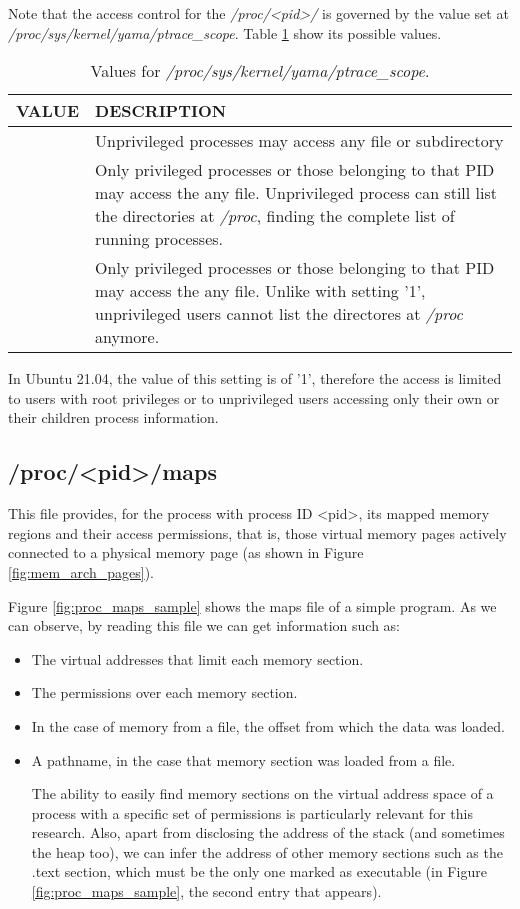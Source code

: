 Note that the access control for the \textit{/proc/<pid>/} is governed by the value set at \textit{/proc/sys/kernel/yama/ptrace\_scope}. Table \ref{table:yama_values} show its possible values.

\begin{table}[htbp]
\begin{tabular}{|>{\centering\arraybackslash}p{3cm}|>{\centering\arraybackslash}p{11cm}|}
\hline
\textbf{VALUE} & \textbf{DESCRIPTION}\\
\hline
\hline
0 & Unprivileged processes may access any file or subdirectory\\
\hline
1 & Only privileged processes or those belonging to that PID may access the any file. Unprivileged process can still list the directories at \textit{/proc}, finding the complete list of running processes.\\
\hline
2 & Only privileged processes or those belonging to that PID may access the any file. Unlike with setting '1', unprivileged users cannot list the directores at \textit{/proc} anymore.\\ 
\hline
\end{tabular}
\caption{Values for \textit{/proc/sys/kernel/yama/ptrace\_scope}.}
\label{table:yama_values}
\end{table}

In Ubuntu 21.04, the value of this setting is of '1', therefore the access is limited to users with root privileges or to unprivileged users accessing only their own or their children process information.

\subsection{/proc/<pid>/maps} \label{subsection:proc_maps}
This file provides, for the process with process ID <pid>, its mapped memory regions and their access permissions, that is, those virtual memory pages actively connected to a physical memory page (as shown in Figure \ref{fig:mem_arch_pages}).

Figure \ref{fig:proc_maps_sample} shows the maps file of a simple program. As we can observe, by reading this file we can get information such as:
\begin{itemize}
\item The virtual addresses that limit each memory section.
\item The permissions over each memory section.
\item In the case of memory from a file, the offset from which the data was loaded.
\item A pathname, in the case that memory section was loaded from a file.

The ability to easily find memory sections on the virtual address space of a process with a specific set of permissions is particularly relevant for this research. Also, apart from disclosing the address of the stack (and sometimes the heap too), we can infer the address of other memory sections such as the .text section, which must be the only one marked as executable (in Figure \ref{fig:proc_maps_sample}, the second entry that appears).

\end{itemize}


